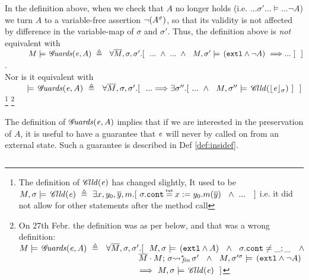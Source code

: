 \documentclass[acmsmall,review,anonymous,screen]{acmart}\settopmatter{printfolios=true,printacmref=false}
\begin{document}
{\noindent
In the definition above, when we check that $A$ no longer holds (i.e. $... \sigma' ... \models ... \neg A$) we turn $A$ to a variable-free assertion $\neg (A^{\sigma})$, so that its validity is not affected by difference in the variable-map of $\sigma$ and $\sigma'$.
Thus, the definition above is \emph{not} equivalent with \\
$\strut \ \ \ \ \ \ \ \ \ M  \models \,  \Guards {\re} {A}   \ \triangleq \ \ 
   \forall \Mtwo, \sigma, \sigma'. [\ \ ... \ \wedge \    ... \ \wedge \ \ M, {\sigma'}   \models   \,  (\extThis \wedge \neg A)    \  \Longrightarrow ... \ ]\  \ ] $.\\
   Nor is it equivalent with\\
$\strut \ \ \  \ \ \ \ \models \,  \Guards {\re} {A}   \ \triangleq \ \ 
   \forall \Mtwo, \sigma, \sigma'.  [\ \ ...   \Longrightarrow \exists \sigma''. [ \   ... \ \wedge\ \ M, {\sigma''}  \models \,     \callsOn {\interpret  {\sigma} \re}\ ]\  \ ] $   
\footnote{The definition of  ${\mathcal C\!{\mathit{lld}}(\mathit{e})}$ has changed slightly, It used to be $M, \sigma \models \,     \callsOn {\re}\ \triangleq \  \exists x,y_0,\overline y,m.[\   \sigma.\prg{cont}\txteq x:=y_0.m(\overline y)  \ \ \wedge\  ... \  \  \ ]$ i.e. it did not allow for 
other statements after the method call}
\footnote{On 27th Febr. the definition was as per below, and that was a wrong definition: \\
  $M  \models \,  \Guards {\re} {A}   \ \triangleq \ \ 
   \forall \Mtwo, \sigma, \sigma'.[\ \ M, \sigma \models \,  (\extThis \wedge A) \ \ \wedge\ \ \sigma.\prg{cont}\neq \_; \_ \ \  \ \wedge $\\
$\strut \hspace{5.05cm}   \leadstoBoundedStarFin  {\Mtwo\cdot M} {\sigma} {\sigma'}\ \ \wedge \ \ M, \as {\sigma'} {\sigma} \models   \,  (\extThis \wedge \neg A)    $\\
$\strut \hspace{5cm}  
   \Longrightarrow \  M, \sigma \models \,     \callsOn {\re} \ \ ] $}

\vspace{.3cm}
   
The definition of  ${\mathcal G}\!\mathit{uards}( {\mathit{e}}, {A})$ implies that if we are interested in the preservation of $A$, it is useful to have a guarantee that  $\mathit{e}$ will never by called on from an external state.  
Such a guarantee is described in Def \ref{def:insidef}.

\begin{definition}
\label{def:insidef} $~ \ $


\end{definition}}
\end{document}
